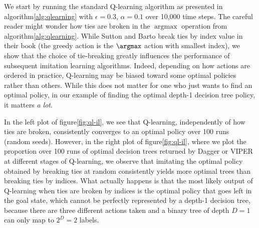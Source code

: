 We start by running the standard Q-learning algorithm as presented in algorithm\ref{alg:qlearning} with $\epsilon=0.3$, $\alpha=0.1$ over 10,000 time steps.
The careful reader might wonder how ties are broken in the $\operatorname{argmax}$ operation from algorithm\ref{alg:qlearning}.
While Sutton and Barto break ties by index value in their book\cite{sutton} (the greedy action is the $\argmax$ action with smallest index), we show that the choice of tie-breaking greatly influences the performance of subsequent imitation learning algorithms.
Indeed, depending on how actions are ordered in practice, Q-learning may be biased toward some optimal policies rather than others.
While this does not matter for one who just wants to find an optimal policy, in our example of finding the optimal depth-1 decision tree policy, it matters \textit{a lot}.

In the left plot of figure\ref{fig:ql-il}, we see that Q-learning, independently of how ties are broken, consistently converges to an optimal policy over 100 runs (random seeds).
However, in the right plot of figure\ref{fig:ql-il}, where we plot the proportion over 100 runs of optimal decision trees returned by Dagger or VIPER at different stages of Q-learning, we observe that imitating the optimal policy obtained by breaking ties at random consistently yields more optimal trees than breaking ties by indices.
What actually happens is that the most likely output of Q-learning when ties are broken by indices is the optimal policy that goes left in the goal state,
which cannot be perfectly represented by a depth-1 decision tree, because there are three different actions taken and a binary tree of depth $D=1$ can only map to $2^D=2$ labels.

